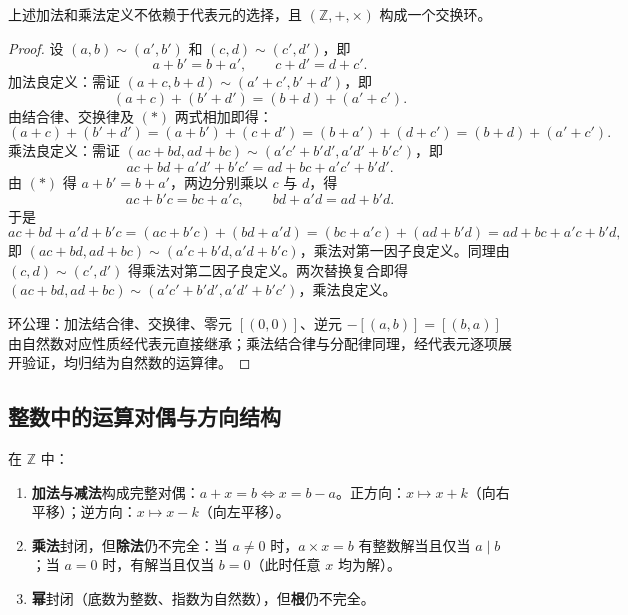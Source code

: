 \begin{proposition}[整数运算是良定义的]\label{prop:integer_well_defined}
上述加法和乘法定义不依赖于代表元的选择，且 $(\mathbb{Z},+,\times)$ 构成一个交换环。
\end{proposition}

\begin{proof}
设 $(a,b) \sim (a',b')$ 和 $(c,d) \sim (c',d')$，即
\[
a+b' = b+a', \qquad c+d' = d+c'. \tag{*}
\]
加法良定义：需证 $(a+c, b+d) \sim (a'+c', b'+d')$，即
\[
(a+c)+(b'+d') = (b+d)+(a'+c').
\]
由结合律、交换律及 $(*)$ 两式相加即得：
\[
(a+c)+(b'+d') = (a+b')+(c+d') = (b+a')+(d+c') = (b+d)+(a'+c').
\]
乘法良定义：需证 $(ac+bd, ad+bc) \sim (a'c'+b'd', a'd'+b'c')$，即
\[
ac + bd + a'd' + b'c' = ad + bc + a'c' + b'd'. \tag{**}
\]
由 $(*)$ 得 $a + b' = b + a'$，两边分别乘以 $c$ 与 $d$，得
\[
ac + b'c = bc + a'c, \qquad bd + a'd = ad + b'd.
\]
于是
\[
ac + bd + a'd + b'c = (ac + b'c) + (bd + a'd) = (bc + a'c) + (ad + b'd) = ad + bc + a'c + b'd,
\]
即 $(ac+bd, ad+bc) \sim (a'c+b'd, a'd+b'c)$，乘法对第一因子良定义。同理由 $(c,d) \sim (c',d')$ 得乘法对第二因子良定义。两次替换复合即得 $(ac+bd, ad+bc) \sim (a'c'+b'd', a'd'+b'c')$，乘法良定义。

环公理：加法结合律、交换律、零元 $[(0,0)]$、逆元 $-[(a,b)] = [(b,a)]$ 由自然数对应性质经代表元直接继承；乘法结合律与分配律同理，经代表元逐项展开验证，均归结为自然数的运算律。
\end{proof}

\subsection{\texorpdfstring{整数中的运算对偶与方向结构}{整数中的运算对偶与方向结构}}

\begin{proposition}[整数中的运算对偶]\label{prop:integer_operation_duality}
在 $\mathbb{Z}$ 中：
\begin{enumerate}[label=(\roman*)]
    \item \textbf{加法与减法}构成完整对偶：$a + x = b \iff x = b - a$。正方向：$x \mapsto x + k$（向右平移）；逆方向：$x \mapsto x - k$（向左平移）。
    \item \textbf{乘法}封闭，但\textbf{除法}仍不完全：当 $a \neq 0$ 时，$a \times x = b$ 有整数解当且仅当 $a \mid b$；当 $a = 0$ 时，有解当且仅当 $b = 0$（此时任意 $x$ 均为解）。
    \item \textbf{幂}封闭（底数为整数、指数为自然数），但\textbf{根}仍不完全。
\end{enumerate}
\end{proposition}

